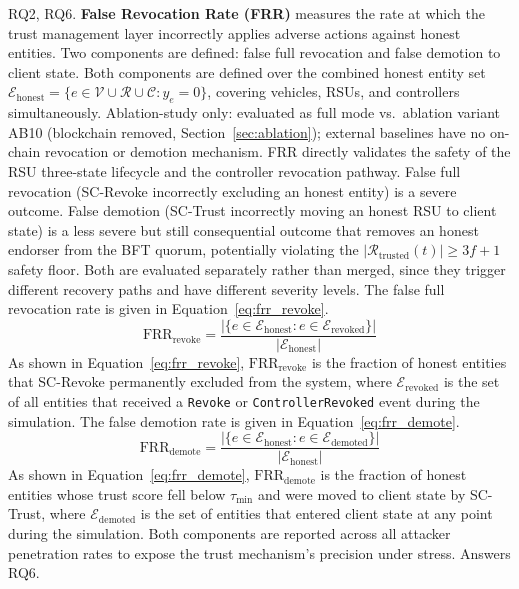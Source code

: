 \documentclass[12pt, a4paper]{report}
\begin{document}
RQ2, RQ6.
\newline
\newline
\textbf{False Revocation Rate (FRR)} measures the rate at which
the trust management layer incorrectly applies adverse actions
against honest entities. Two components are defined: false full
revocation and false demotion to client state. Both components
are defined over the combined honest entity set
$\mathcal{E}_{\mathrm{honest}} = \{e \in \mathcal{V} \cup
\mathcal{R} \cup \mathcal{C} : y_e = 0\}$, covering vehicles,
RSUs, and controllers simultaneously. Ablation-study only: evaluated as full mode
vs.\ ablation variant AB10 (blockchain removed,
Section~\ref{sec:ablation}); external baselines have no on-chain
revocation or demotion mechanism.
\newline
\newline
FRR directly validates the safety of the RSU three-state lifecycle
and the controller revocation pathway. False full revocation
(SC-Revoke incorrectly excluding an honest entity) is a severe
outcome. False demotion (SC-Trust incorrectly moving an honest
RSU to client state) is a less severe but still consequential
outcome that removes an honest endorser from the BFT quorum,
potentially violating the $|\mathcal{R}_{\mathrm{trusted}}(t)|
\geq 3f+1$ safety floor. Both are evaluated separately rather
than merged, since they trigger different recovery paths and have
different severity levels. The false full revocation rate is
given in Equation~\ref{eq:frr_revoke}.
\begin{equation}
  \mathrm{FRR}_{\mathrm{revoke}} =
    \frac{|\{e \in \mathcal{E}_{\mathrm{honest}}
          : e \in \mathcal{E}_{\mathrm{revoked}}\}|}
         {|\mathcal{E}_{\mathrm{honest}}|}
  \label{eq:frr_revoke}
\end{equation}
As shown in Equation~\ref{eq:frr_revoke},
$\mathrm{FRR}_{\mathrm{revoke}}$ is the fraction of honest
entities that SC-Revoke permanently excluded from the system,
where $\mathcal{E}_{\mathrm{revoked}}$ is the set of all entities
that received a \texttt{Revoke} or \texttt{ControllerRevoked}
event during the simulation. The false demotion rate is given
in Equation~\ref{eq:frr_demote}.
\begin{equation}
  \mathrm{FRR}_{\mathrm{demote}} =
    \frac{|\{e \in \mathcal{E}_{\mathrm{honest}}
          : e \in \mathcal{E}_{\mathrm{demoted}}\}|}
         {|\mathcal{E}_{\mathrm{honest}}|}
  \label{eq:frr_demote}
\end{equation}
As shown in Equation~\ref{eq:frr_demote},
$\mathrm{FRR}_{\mathrm{demote}}$ is the fraction of honest
entities whose trust score fell below $\tau_{\min}$ and were
moved to client state by SC-Trust, where
$\mathcal{E}_{\mathrm{demoted}}$ is the set of entities that
entered client state at any point during the simulation.
Both components are reported across all attacker penetration
rates to expose the trust mechanism's precision under stress.
Answers RQ6.
\end{document}
